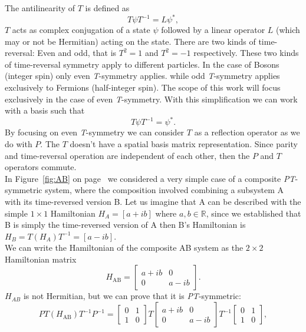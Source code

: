 \documentclass[10pt, a4paper, singlespacing, headsepline]{article}
\newcommand\PT{\textit{PT}}
\newcommand\TT{\textit{T}}
\begin{document}
The antilinearity of $T$ is defined as 
\begin{equation}
T \psi T^{-1}= L \psi^{*},
\end{equation}  
$T$ acts as complex conjugation of a state $\psi$ followed by a linear operator $L$ (which may or not be Hermitian) acting on the state. There are two kinds of time-reversal: Even and odd, that is $T^2 = 1$ and $T^2 = -1$ respectively. These two kinds of time-reversal symmetry apply to different particles. In the case of Bosons (integer spin) only even \TT-symmetry applies. while odd \TT-symmetry applies exclusively to Fermions (half-integer spin)\cite{Jones-Smith}.
The scope of this work will focus exclusively in the case of even \TT-symmetry. With this simplification we can work with a basis such that 
\begin{equation}
T \psi T^{-1} = \psi^{*}.
\end{equation}
By focusing on even \TT-symmetry we can consider $T$ as a reflection operator as we do with $P$. The $T$ doesn't have a spatial basis matrix representation.
Since parity and time-reversal operation are independent of each other, then the $P$ and $T$ operators commute\cite{BenderPT}.\\
In Figure~\ref{fig:AB} on page~\pageref{fig:AB} we considered a very simple case of a composite \PT-symmetric system, where the composition involved combining a subsystem A with its time-reversed version B.
Let us imagine that A can be described with the simple $1 \times 1 $ Hamiltonian $H_{A} = [a+ib]$ where $a, b \in \mathds{R}$, since we established that B is simply the time-reversed version of A then B's Hamiltonian is $H_{B} = T (H_{A}) T^{-1} = [a-ib]$.\\
We can write the Hamiltonian of the composite AB system as the $2 \times 2$ Hamiltonian matrix
\begin{equation} \label{eq:5}
H_{\mathrm{AB}} = \begin{bmatrix}
a+ib & 0 \\ 
0 & a-ib
\end{bmatrix}.
\end{equation}
$H_{AB}$ is not Hermitian, but we can prove that it is \PT-symmetric:
\begin{equation}
PT(H_{\mathrm{AB}})T^{-1}P^{-1} = \begin{bmatrix}
0 & 1 \\ 
1 & 0
\end{bmatrix}
T
\begin{bmatrix}
a+ib & 0 \\ 
0 & a-ib
\end{bmatrix}
T^{-1}
\begin{bmatrix}
0 & 1 \\ 
1 & 0
\end{bmatrix},
\end{equation}
\end{document}
